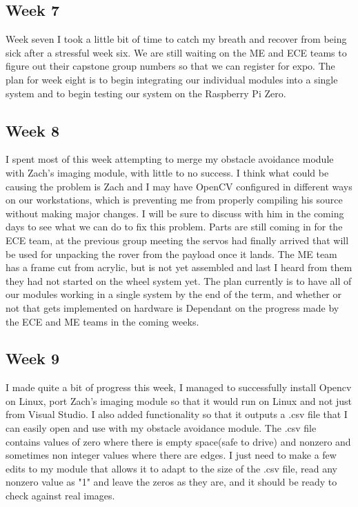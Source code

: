 \documentclass[10pt,letterpaper,onecolumn,draftclsnofoot,journal]{IEEEtran}
\begin{document}
\subsection{Week 7}
Week seven I took a little bit of time to catch my breath and recover from being sick after a stressful week six. We are still waiting on the ME and ECE teams to figure out their capstone group numbers so that we can register for expo. The plan for week eight is to begin integrating our individual modules into a single system and to begin testing our system on the Raspberry Pi Zero.

\subsection{Week 8}
I spent most of this week attempting to merge my obstacle avoidance module with Zach's imaging module, with little to no success. I think what could be causing the problem is Zach and I may have OpenCV configured in different ways on our workstations, which is preventing me from properly compiling his source without making major changes. I will be sure to discuss with him in the coming days to see what we can do to fix this problem. Parts are still coming in for the ECE team, at the previous group meeting the servos had finally arrived that will be used for unpacking the rover from the payload once it lands. The ME team has a frame cut from acrylic, but is not yet assembled and last I heard from them they had not started on the wheel system yet. The plan currently is to have all of our modules working in a single system by the end of the term, and whether or not that gets implemented on hardware is Dependant on the progress made by the ECE and ME teams in the coming weeks.

\subsection{Week 9}
I made quite a bit of progress this week, I managed to successfully install Opencv on Linux, port Zach's imaging module so that it would run on Linux and not just from Visual Studio. I also added functionality so that it outputs a .csv file that I can easily open and use with my obstacle avoidance module. The .csv file contains values of zero where there is empty space(safe to drive) and nonzero and sometimes non integer values where there are edges. I just need to make a few edits to my module that allows it to adapt to the size of the .csv file, read any nonzero value as "1" and leave the zeros as they are, and it should be ready to check against real images.
\end{document}
